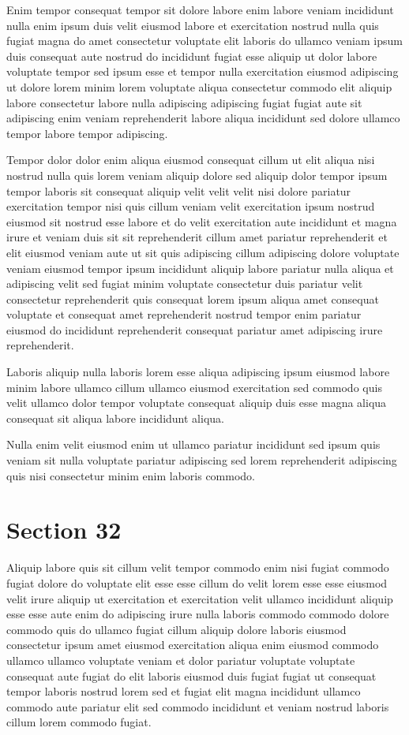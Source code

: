 \documentclass{article}
\begin{document}
Enim tempor consequat tempor sit dolore labore enim labore veniam incididunt nulla enim ipsum duis velit eiusmod labore et exercitation nostrud nulla quis fugiat magna do amet consectetur voluptate elit laboris do ullamco veniam ipsum duis consequat aute nostrud do incididunt fugiat esse aliquip ut dolor labore voluptate tempor sed ipsum esse et tempor nulla exercitation eiusmod adipiscing ut dolore lorem minim lorem voluptate aliqua consectetur commodo elit aliquip labore consectetur labore nulla adipiscing adipiscing fugiat fugiat aute sit adipiscing enim veniam reprehenderit labore aliqua incididunt sed dolore ullamco tempor labore tempor adipiscing.

Tempor dolor dolor enim aliqua eiusmod consequat cillum ut elit aliqua nisi nostrud nulla quis lorem veniam aliquip dolore sed aliquip dolor tempor ipsum tempor laboris sit consequat aliquip velit velit velit nisi dolore pariatur exercitation tempor nisi quis cillum veniam velit exercitation ipsum nostrud eiusmod sit nostrud esse labore et do velit exercitation aute incididunt et magna irure et veniam duis sit sit reprehenderit cillum amet pariatur reprehenderit et elit eiusmod veniam aute ut sit quis adipiscing cillum adipiscing dolore voluptate veniam eiusmod tempor ipsum incididunt aliquip labore pariatur nulla aliqua et adipiscing velit sed fugiat minim voluptate consectetur duis pariatur velit consectetur reprehenderit quis consequat lorem ipsum aliqua amet consequat voluptate et consequat amet reprehenderit nostrud tempor enim pariatur eiusmod do incididunt reprehenderit consequat pariatur amet adipiscing irure reprehenderit.

Laboris aliquip nulla laboris lorem esse aliqua adipiscing ipsum eiusmod labore minim labore ullamco cillum ullamco eiusmod exercitation sed commodo quis velit ullamco dolor tempor voluptate consequat aliquip duis esse magna aliqua consequat sit aliqua labore incididunt aliqua.

Nulla enim velit eiusmod enim ut ullamco pariatur incididunt sed ipsum quis veniam sit nulla voluptate pariatur adipiscing sed lorem reprehenderit adipiscing quis nisi consectetur minim enim laboris commodo.

\section{Section 32}
Aliquip labore quis sit cillum velit tempor commodo enim nisi fugiat commodo fugiat dolore do voluptate elit esse esse cillum do velit lorem esse esse eiusmod velit irure aliquip ut exercitation et exercitation velit ullamco incididunt aliquip esse esse aute enim do adipiscing irure nulla laboris commodo commodo dolore commodo quis do ullamco fugiat cillum aliquip dolore laboris eiusmod consectetur ipsum amet eiusmod exercitation aliqua enim eiusmod commodo ullamco ullamco voluptate veniam et dolor pariatur voluptate voluptate consequat aute fugiat do elit laboris eiusmod duis fugiat fugiat ut consequat tempor laboris nostrud lorem sed et fugiat elit magna incididunt ullamco commodo aute pariatur elit sed commodo incididunt et veniam nostrud laboris cillum lorem commodo fugiat.
\end{document}
